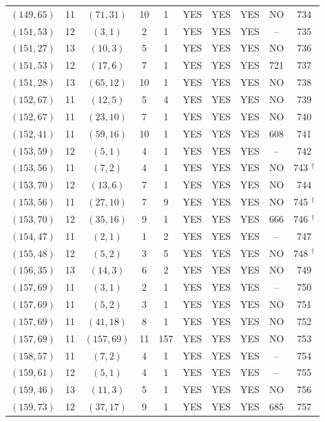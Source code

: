 \begin{longtable}{|c|c|c|c|c|c|c|c|c|c|}
$(149, 65)$ & 11 & $(71, 31)$ & 10 & 1 & YES & YES & YES & NO & 734\\
$(151, 53)$ & 12 & $(3, 1)$ & 2 & 1 & YES & YES & YES & -- & 735\\
$(151, 27)$ & 13 & $(10, 3)$ & 5 & 1 & YES & YES & YES & NO & 736\\
$(151, 53)$ & 12 & $(17, 6)$ & 7 & 1 & YES & YES & YES & 721 & 737\\
$(151, 28)$ & 13 & $(65, 12)$ & 10 & 1 & YES & YES & YES & NO & 738\\
$(152, 67)$ & 11 & $(12, 5)$ & 5 & 4 & YES & YES & YES & NO & 739\\
$(152, 67)$ & 11 & $(23, 10)$ & 7 & 1 & YES & YES & YES & NO & 740\\
$(152, 41)$ & 11 & $(59, 16)$ & 10 & 1 & YES & YES & YES & 608 & 741\\
$(153, 59)$ & 12 & $(5, 1)$ & 4 & 1 & YES & YES & YES & -- & 742\\
$(153, 56)$ & 11 & $(7, 2)$ & 4 & 1 & YES & YES & YES & NO & 743 ${}^\dagger$\\
$(153, 70)$ & 12 & $(13, 6)$ & 7 & 1 & YES & YES & YES & NO & 744\\
$(153, 56)$ & 11 & $(27, 10)$ & 7 & 9 & YES & YES & YES & NO & 745 ${}^\dagger$\\
$(153, 70)$ & 12 & $(35, 16)$ & 9 & 1 & YES & YES & YES & 666 & 746 ${}^\dagger$\\
$(154, 47)$ & 11 & $(2, 1)$ & 1 & 2 & YES & YES & YES & -- & 747\\
$(155, 48)$ & 12 & $(5, 2)$ & 3 & 5 & YES & YES & YES & NO & 748 ${}^\dagger$\\
$(156, 35)$ & 13 & $(14, 3)$ & 6 & 2 & YES & YES & YES & NO & 749\\
$(157, 69)$ & 11 & $(3, 1)$ & 2 & 1 & YES & YES & YES & -- & 750\\
$(157, 69)$ & 11 & $(5, 2)$ & 3 & 1 & YES & YES & YES & NO & 751\\
$(157, 69)$ & 11 & $(41, 18)$ & 8 & 1 & YES & YES & YES & NO & 752\\
$(157, 69)$ & 11 & $(157, 69)$ & 11 & 157 & YES & YES & YES & NO & 753\\
$(158, 57)$ & 11 & $(7, 2)$ & 4 & 1 & YES & YES & YES & -- & 754\\
$(159, 61)$ & 12 & $(5, 1)$ & 4 & 1 & YES & YES & YES & -- & 755\\
$(159, 46)$ & 13 & $(11, 3)$ & 5 & 1 & YES & YES & YES & NO & 756\\
$(159, 73)$ & 12 & $(37, 17)$ & 9 & 1 & YES & YES & YES & 685 & 757\\

\end{longtable}

